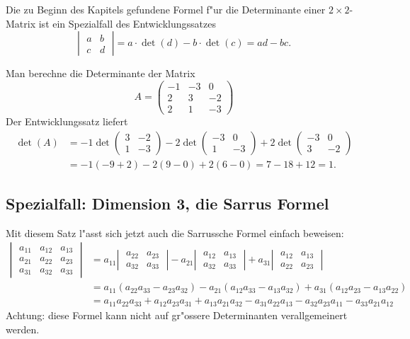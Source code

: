 \begin{beispiel}Die zu Beginn des Kapitels gefundene Formel f"ur
die Determinante einer $2\times 2$-Matrix ist ein Spezialfall
des Entwicklungssatzes
\[
\left|\;
\begin{matrix}
a&b\\c&d
\end{matrix}
\;\right|
=a\cdot\det(d)-b\cdot\det(c)=ad-bc.
\]
\end{beispiel}

\begin{beispiel}
Man berechne die Determinante der Matrix
\[
A=\begin{pmatrix}
-1&-3&0\\
2&3&-2\\
2&1&-3
\end{pmatrix}
\]
Der Entwicklungssatz liefert
\begin{align*}
\det(A)&=
-1\det\begin{pmatrix}3&-2\\1&-3\end{pmatrix}
-2\det\begin{pmatrix}-3&0\\1&-3\end{pmatrix}
+2\det\begin{pmatrix}-3&0\\3&-2\end{pmatrix}
\\
&=
-1(-9+2)-2(9-0)+2(6-0)=7-18+12=1.
\end{align*}
\end{beispiel}

\subsection{Spezialfall: Dimension 3, die Sarrus Formel}
Mit diesem Satz l"asst sich jetzt auch die Sarrussche Formel einfach beweisen:
\begin{align*}
\left|\;
\begin{matrix}
a_{11}&a_{12}&a_{13}\\
a_{21}&a_{22}&a_{23}\\
a_{31}&a_{32}&a_{33}
\end{matrix}\;\right|
&=
a_{11}
\left|\;\begin{matrix}
a_{22}&a_{23}\\
a_{32}&a_{33}
\end{matrix}\;\right|
-
a_{21}
\left|\;\begin{matrix}
a_{12}&a_{13}\\
a_{32}&a_{33}
\end{matrix}\;\right|
+
a_{31}
\left|\;\begin{matrix}
a_{12}&a_{13}\\
a_{22}&a_{23}
\end{matrix}\;\right|
\\
&=a_{11}(a_{22}a_{33}-a_{23}a_{32})
-a_{21}(a_{12}a_{33}-a_{13}a_{32})
+a_{31}(a_{12}a_{23}-a_{13}a_{22})
\\
&=
a_{11}a_{22}a_{33}+a_{12}a_{23}a_{31}+a_{13}a_{21}a_{32}
-a_{31}a_{22}a_{13}-a_{32}a_{23}a_{11}-a_{33}a_{21}a_{12}
\end{align*}
Achtung: diese Formel kann nicht auf gr"ossere Determinanten
verallgemeinert werden.

